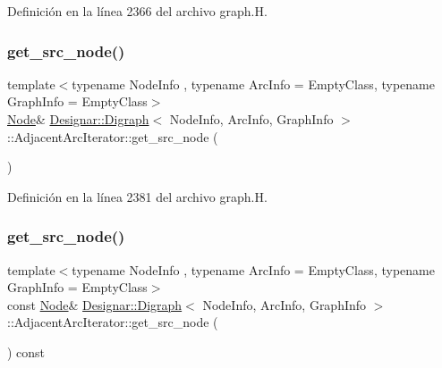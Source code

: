 Definición en la línea 2366 del archivo graph.\+H.

\mbox{\label{class_designar_1_1_digraph_1_1_adjacent_arc_iterator_a72e125198f4cea2ab0ac1213c1cbc1e4}} 
\subsubsection{\texorpdfstring{get\+\_\+src\+\_\+node()}{get\_src\_node()}\hspace{0.1cm}{\footnotesize\ttfamily [1/2]}}
{\footnotesize\ttfamily template$<$typename Node\+Info , typename Arc\+Info  = Empty\+Class, typename Graph\+Info  = Empty\+Class$>$ \\
\hyperlink{class_designar_1_1_digraph_a4dc921c41a480b7946a04170e997d8ae}{Node}\& \hyperlink{class_designar_1_1_digraph}{Designar\+::\+Digraph}$<$ Node\+Info, Arc\+Info, Graph\+Info $>$\+::Adjacent\+Arc\+Iterator\+::get\+\_\+src\+\_\+node (\begin{DoxyParamCaption}{ }\end{DoxyParamCaption})\hspace{0.3cm}{\ttfamily [inline]}}



Definición en la línea 2381 del archivo graph.\+H.

\mbox{\label{class_designar_1_1_digraph_1_1_adjacent_arc_iterator_a09c51f5124610cd6e5360dc7039b4639}} 
\subsubsection{\texorpdfstring{get\+\_\+src\+\_\+node()}{get\_src\_node()}\hspace{0.1cm}{\footnotesize\ttfamily [2/2]}}
{\footnotesize\ttfamily template$<$typename Node\+Info , typename Arc\+Info  = Empty\+Class, typename Graph\+Info  = Empty\+Class$>$ \\
const \hyperlink{class_designar_1_1_digraph_a4dc921c41a480b7946a04170e997d8ae}{Node}\& \hyperlink{class_designar_1_1_digraph}{Designar\+::\+Digraph}$<$ Node\+Info, Arc\+Info, Graph\+Info $>$\+::Adjacent\+Arc\+Iterator\+::get\+\_\+src\+\_\+node (\begin{DoxyParamCaption}{ }\end{DoxyParamCaption}) const\hspace{0.3cm}{\ttfamily [inline]}}



